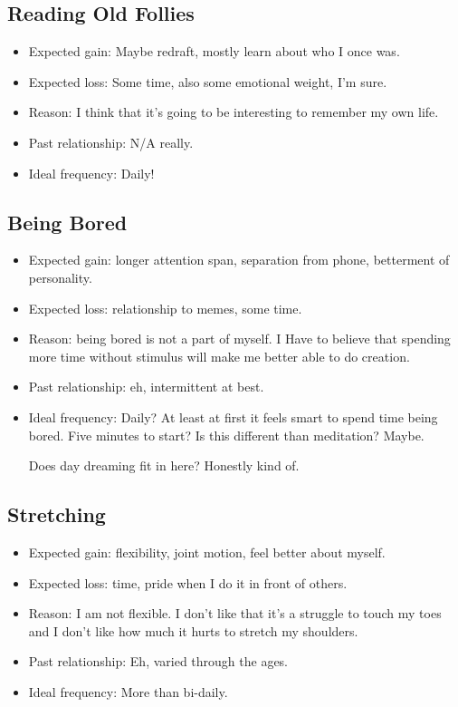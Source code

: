 \documentclass[12pt]{article}
\renewcommand{\,}{\textsuperscript{,}}
\begin{document}
\subsection{Reading Old Follies}
\begin{itemize}
    \item Expected gain: Maybe redraft, mostly learn about who I once was.
    \item Expected loss: Some time, also some emotional weight, I'm sure.
    \item Reason: I think that it's going to be interesting to remember my own life.
    \item Past relationship: N/A really.
    \item Ideal frequency: Daily!

\end{itemize}

\subsection{Being Bored}
\begin{itemize}
    \item Expected gain: longer attention span, separation from phone, betterment of personality.
    \item Expected loss: relationship to memes, some time.
    \item Reason: being bored is not a part of myself. I Have to believe that spending more time without stimulus will make me better able to do creation.
    \item Past relationship: eh, intermittent at best.
    \item Ideal frequency: Daily? At least at first it feels smart to spend time being bored. Five minutes to start? Is this different than meditation? Maybe. 

    Does day dreaming fit in here? Honestly kind of.
\end{itemize}

\subsection{Stretching}
\begin{itemize}
    \item Expected gain: flexibility, joint motion, feel better about myself.
    \item Expected loss: time, pride when I do it in front of others.
    \item Reason: I am not flexible. I don't like that it's a struggle to touch my toes and I don't like how much it hurts to stretch my shoulders.
    \item Past relationship: Eh, varied through the ages.
    \item Ideal frequency: More than bi-daily.

\end{itemize}
\end{document}
